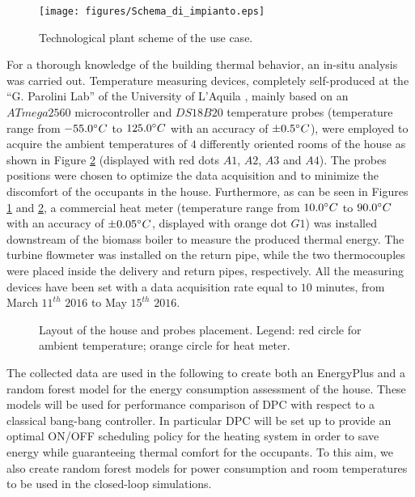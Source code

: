 \begin{figure}[h!]
	\begin{center}
		\texttt{[image: figures/Schema\_di\_impianto.eps]}
		\caption{Technological plant scheme of the use case.}
		\captionsetup{justification=centering}
		\label{F:housePlantScheme}
	\end{center}
\end{figure}
For a thorough knowledge of the building thermal behavior, an in-situ analysis was carried out. Temperature measuring devices, completely self-produced at the “G. Parolini Lab” of the University of L'Aquila \cite{Pantoli2017}, mainly based on an $ATmega 2560$ microcontroller and $DS18B20$ temperature probes (temperature range from $-55.0\degree C$ to $125.0\degree C$ with an accuracy of $\pm 0.5\degree C$), were employed to acquire the ambient temperatures of $4$ differently oriented rooms of the house as shown in Figure \ref{F:houseFloors} (displayed with red dots $A1$, $A2$, $A3$ and $A4$). The probes positions were chosen to optimize the data acquisition and to minimize the discomfort of the occupants in the house. Furthermore, as can be seen in Figures \ref{F:housePlantScheme} and \ref{F:houseFloors}, a commercial heat meter (temperature range from $10.0\degree C$ to $90.0\degree C$ with an accuracy of $\pm 0.05\degree C$, displayed with orange dot $G1$) was installed downstream of the biomass boiler to measure the produced thermal energy. The turbine flowmeter was installed on the return pipe, while the two thermocouples were placed inside the delivery and return pipes, respectively. All the measuring devices have been set with a data acquisition rate equal to $10$ minutes, from March $11^{th}$ $2016$ to May $15^{th}$ $2016$.
\begin{figure}[h!]
	\begin{center}
	\end{center}
	\caption{Layout of the house and probes placement. Legend: red circle for ambient temperature; orange circle for heat meter.}
	\captionsetup{justification=centering}
	\label{F:houseFloors}
\end{figure}

The collected data are used in the following to create both an EnergyPlus and a random forest model for the energy consumption assessment of the house. These models will be used for performance comparison of DPC with respect to a classical bang-bang controller. In particular DPC will be set up to provide an optimal ON/OFF scheduling policy for the heating system in order to save energy while guaranteeing thermal comfort for the occupants. To this aim, we also create random forest models for power consumption and room temperatures to be used in the closed-loop simulations. 

